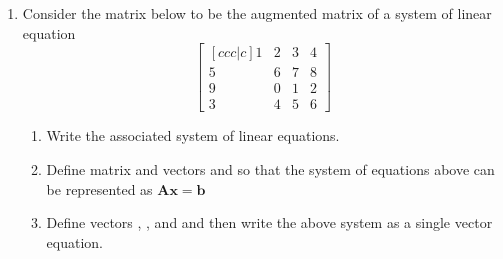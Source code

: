 \documentclass[basic]{inVerba-notes}
\begin{document}
\begin{enumerate}\color{minor}
  \item Consider the matrix below to be the augmented matrix of a system of linear equation
  \[%
  \begin{bmatrix}[ccc|c]
  1 & 2 & 3 & 4 \\
  5 & 6 & 7 & 8 \\
  9 & 0 & 1 & 2 \\
  3 & 4 & 5 & 6
  \end{bmatrix}
  \]%
  \begin{enumerate}
    \item Write the associated system of linear equations.
    \basec{\[%
    \begin{cases}
    1x_1+2x_2+3x_3 = 4 \\
    5x_1+6x_2+7x_3 = 8 \\
    9x_1+0x_2+1x_3 = 2 \\
    3x_1+4x_2+5x_3 = 6 
    \end{cases}
    \]}%
    \item Define matrix  and vectors  and  so that the system of equations above can be represented as \(\bm{Ax}=\bm{b}\) 
    \basec{\[%
    \bm{A}=\begin{bmatrix}
    1 & 2 & 3 \\
    5 & 6 & 7 \\
    9 & 0 & 1 \\
    3 & 4 & 5
    \end{bmatrix}
    \quad
    \bm{x}=\begin{bmatrix}
    x_1 \\ x_2 \\ x_3 
    \end{bmatrix}
    \quad 
    \bm{b}=\begin{bmatrix}
    4 \\ 8 \\ 2 \\ 6 
    \end{bmatrix}
    \]}%
    \item Define vectors , , and  and then write the above system as a single vector equation.
    \basec{\[%
    \bm{a_1} = \begin{bmatrix} 1x_1 \\ 5x_1 \\ 9x_1 \\ 3x_1 \end{bmatrix}\quad
\]}
\end{enumerate}
\end{enumerate}
\end{document}
